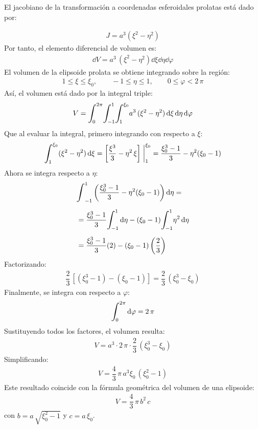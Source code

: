 \documentclass[hidelinks,12pt]{article}
\def\scaleint#1{\vcenter{\hbox{\scaleto[3ex]{\displaystyle\int}{#1}}}}
\def\bs{\mkern-12mu}
\begin{document}
\begin{enumerate}
El jacobiano de la transformación a coordenadas esferoidales prolatas está dado por:

\begin{align*}
    J = a^{3} (\xi^{2} - \eta^{2})
\end{align*}
Por tanto, el elemento diferencial de volumen es:
\begin{align*}
    \dd{V} = a^{3} \, (\xi^{2} - \eta^{2}) \dd{\xi} \dd{\eta} \dd{\varphi}
\end{align*}
El volumen de la elipsoide prolata se obtiene integrando sobre la región:
\begin{align*}
    1 \le \xi \le \xi_{0}, \qquad -1 \le \eta \le 1, \qquad 0 \le \varphi < 2 \, \pi
\end{align*}
Así, el volumen está dado por la integral triple:
\begin{align*}
V = \scaleint{6ex}_{\bs 0}^{2 \pi} \scaleint{6ex}_{\bs -1}^{1} \scaleint{6ex}_{\bs 1}^{\xi_{0}} a^{3} \, (\xi^{2} - \eta^{2}) \dd{\xi} \dd{\eta} \dd{\varphi}
\end{align*}
Que al evaluar la integral, primero integrando con respecto a $\xi$:
\begin{align*}
    \scaleint{6ex}_{\bs 1}^{\xi_{0}} (\xi^{2} - \eta^{2}) \dd{\xi} = \left[ \dfrac{\xi^{3}}{3} - \eta^{2} \, \xi \right] \eval_{1}^{\xi_{0}} = \dfrac{\xi_{0}^{3} - 1}{3} - \eta^{2}(\xi_{0} - 1)
\end{align*}
Ahora se integra respecto a $\eta$:
\begin{align*}
&\scaleint{6ex}_{-1}^{1} \left( \dfrac{\xi_{0}^{3} - 1}{3} - \eta^{2}(\xi_{0} - {1}) \right) \dd{\eta} = \\[0.5em]
&= \dfrac{\xi_{0}^{3} - 1}{3} \scaleint{6ex}_{\bs -1}^{1} \dd{\eta} - (\xi_{0} - 1) \scaleint{6ex}_{\bs -1}^{1} \eta^{2} \dd{\eta} \\[0.5em]
&= \dfrac{\xi_{0}^{3} - 1}{3}(2) - (\xi_{0} - 1) \left( \dfrac{2}{3} \right)
\end{align*}
Factorizando:
\begin{align*}
    \dfrac{2}{3} \, \left[(\xi_{0}^{3} - 1) - (\xi_{0} - 1) \right] = \dfrac{2}{3} \, \left( \xi_{0}^{3} - \xi_{0} \right)
\end{align*}
Finalmente, se integra con respecto a $\varphi$:
\begin{align*}
    \scaleint{6ex}_{\bs 0}^{2 \pi} \dd{\varphi} = 2 \, \pi
\end{align*}
Sustituyendo todos los factores, el volumen resulta:
\begin{align*}
    V = a^{3} \cdot 2 \, \pi \cdot \dfrac{2}{3} \, (\xi_{0}^{3} - \xi_{0})
\end{align*}
Simplificando:
\begin{align*}
    \boxed{V = \dfrac{4}{3} \, \pi \, a^{3} \xi_{0} \, \left( \xi_{0}^{2} - 1 \right)}
\end{align*}
Este resultado coincide con la fórmula geométrica del volumen de una elipsoide:
\begin{align*}
    V = \dfrac{4}{3} \, \pi \, b^{2} \, {c}
\end{align*}
con $b = a \, \sqrt{\xi_{0}^{2} - 1}$ y $c = a \, \xi_{0}$.


\end{enumerate}
\end{document}
